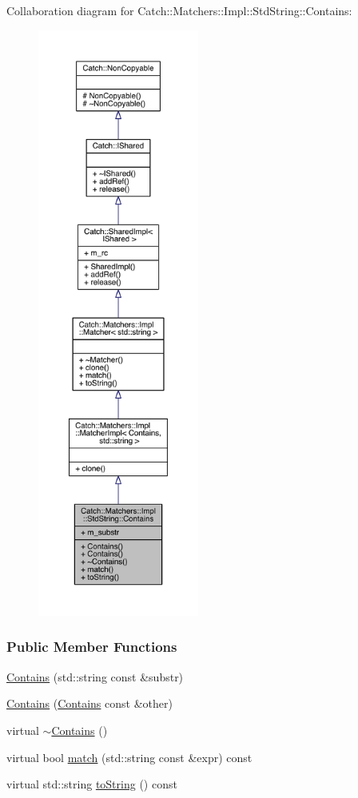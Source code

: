 Collaboration diagram for Catch\+:\+:Matchers\+:\+:Impl\+:\+:Std\+String\+:\+:Contains\+:\nopagebreak
\begin{figure}[H]
\begin{center}
\leavevmode
\includegraphics[height=550pt]{a00349}
\end{center}
\end{figure}
\subsubsection*{Public Member Functions}
\begin{DoxyCompactItemize}
\item 
\hyperlink{a00013_ac6f13133724bfd5796e8ee4ea8f2c0e3}{Contains} (std\+::string const \&substr)
\item 
\hyperlink{a00013_ad6b1ef653dfcb3bab43c43be043dc4e8}{Contains} (\hyperlink{a00013}{Contains} const \&other)
\item 
virtual \hyperlink{a00013_ae7a327dca00ff985b69b39bc883b7cb2}{$\sim$\+Contains} ()
\item 
virtual bool \hyperlink{a00013_aa27d823dea5770025a24424fc3355a6f}{match} (std\+::string const \&expr) const 
\item 
virtual std\+::string \hyperlink{a00013_a226755351f3598179925f3ab89d6def7}{to\+String} () const 
\end{DoxyCompactItemize}
